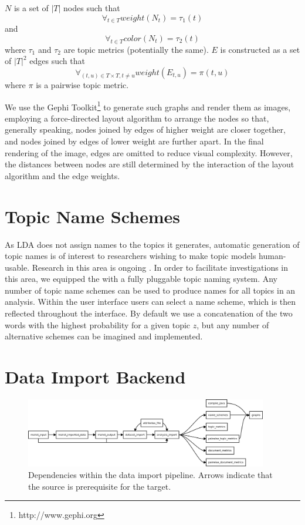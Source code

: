 \documentclass[11pt]{article}
\begin{document}
$N$ is a set of $|T|$ nodes such that
\[\forall_{t\in T} weight(N_{t}) = \tau_{1}(t)\]
and
\[\forall_{t\in T} color(N_{t}) = \tau_{2}(t)\]
where $\tau_1$ and $\tau_2$ are topic metrics (potentially the same). $E$ is
constructed as a set of $|T|^2$ edges such that
  \[\forall_{(t,u)\in T\times T, t\neq u} weight(E_{t,u}) = \pi(t,u)\]
where $\pi$ is a pairwise topic metric.

We use the Gephi Toolkit\footnote{http://www.gephi.org} to generate such graphs
and render them as images, employing a force-directed layout algorithm to
arrange the nodes so that, generally speaking, nodes joined by edges of higher
weight are closer together, and nodes joined by edges of lower weight are
further apart. In the final rendering of the image, edges are omitted to reduce
visual complexity. However, the distances between nodes are still determined by
the interaction of the layout algorithm and the edge weights. 


\section{Topic Name Schemes}
As LDA does not assign names to the topics it generates, automatic generation of
topic names is of interest to researchers wishing to make topic models
human-usable. Research in this area is ongoing \cite{Mei2007,Lau2010}. In order to
facilitate investigations in this area, we equipped the \tool{} with a
fully pluggable topic naming system. Any number of topic name schemes can be
used to produce names for all topics in an analysis. Within the user interface
users can select a name scheme, which is then reflected throughout the
interface. By default we use a concatenation of the two
words with the highest probability for a given topic $z$, but any number of
alternative schemes can be imagined and implemented.%

\section{Data Import Backend}
\begin{figure}[t]
 \centering
 \includegraphics[width=400px,keepaspectratio=true]{./build_flowchart.png}
 \caption{Dependencies within the data import pipeline. Arrows indicate that the source is prerequisite for the target.}
 \label{fig:build_flowchart}
\end{figure}
\end{document}
